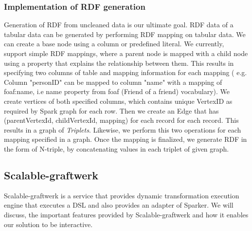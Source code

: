 \subsubsection{Implementation of RDF generation}
Generation of RDF from uncleaned data is our ultimate goal. RDF data of a tabular data can be generated by performing RDF mapping on tabular data. We can create a base node using a column or predefined literal. We currently, support simple RDF mappings, where a parent node is mapped with a child node using a property that explains the relationship between them. This results in specifying two columns of table and mapping information for each mapping ( e.g. Column "personID" can be mapped to column "name" with a mapping of foaf:name, i.e name property from foaf (Friend of a friend) vocabulary).  We create vertices of both specified columns, which contains unique VertexID as required by Spark graph for each row. Then we create an Edge that has (parentVertexId, childVertexId, mapping) for each record for each record. This results in a graph of \textit{Triplets}. Likewise, we perform this two operations for each mapping specified in a graph. Once the mapping is finalized,  we generate RDF in the form of N-triple, by concatenating values in each triplet of given graph. 

\subsection{Scalable-graftwerk}
Scalable-graftwerk is a service that provides dynamic transformation execution engine that executes a DSL and also provides an adapter of Sparker. We will discuss, the important features provided by Scalable-graftwerk and how it enables our solution to be interactive.
